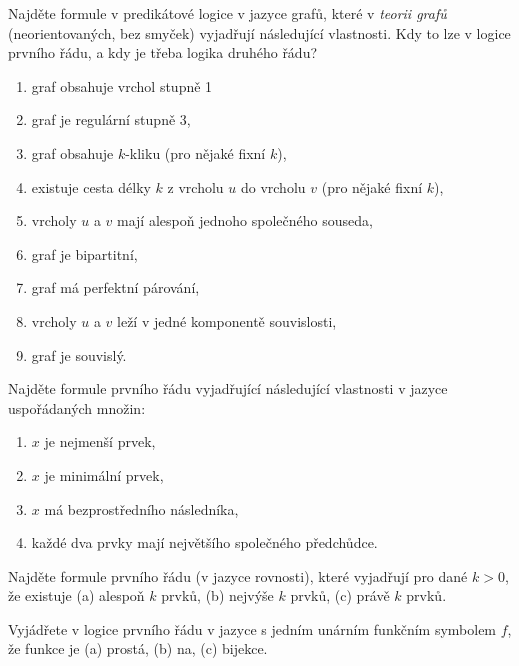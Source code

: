 \documentclass[a4paper,12pt]{article}
\begin{document}
\medskip\begin{problem}
Najděte formule v predikátové logice v jazyce grafů, které v \emph{teorii grafů} (neorientovaných, bez smyček) vyjadřují následující vlastnosti. Kdy to lze v logice prvního řádu, a kdy je třeba logika druhého řádu?
\begin{enumerate}
    \item graf obsahuje vrchol stupně 1
    \item graf je regulární stupně 3,
    \item graf obsahuje $k$-kliku (pro nějaké fixní $k$),
    \item existuje cesta délky $k$ z vrcholu $u$ do vrcholu $v$ (pro nějaké fixní $k$),
    \item vrcholy $u$ a $v$ mají alespoň jednoho společného souseda,
    \item graf je bipartitní,
    \item graf má perfektní párování,
    \item vrcholy $u$ a $v$ leží v jedné komponentě souvislosti,
    \item graf je souvislý.    
\end{enumerate}
\end{problem}


\medskip\begin{problem} Najděte formule prvního řádu vyjadřující následující vlastnosti v jazyce uspořádaných množin:
\begin{enumerate}
    \item $x$ je nejmenší prvek,
    \item $x$ je minimální prvek,
    \item $x$ má bezprostředního následníka,
    \item každé dva prvky mají největšího společného předchůdce.
\end{enumerate}
\end{problem}


\medskip\begin{problem} Najděte formule prvního řádu (v jazyce rovnosti), které vyjadřují pro dané $k>0$, že existuje (a) alespoň $k$ prvků, (b) nejvýše $k$ prvků, (c) právě $k$ prvků.
\end{problem}


\medskip\begin{problem} Vyjádřete v logice prvního řádu v jazyce s jedním unárním funkčním symbolem $f$, že funkce je (a) prostá, (b) na, (c) bijekce.
\end{problem}
\end{document}
